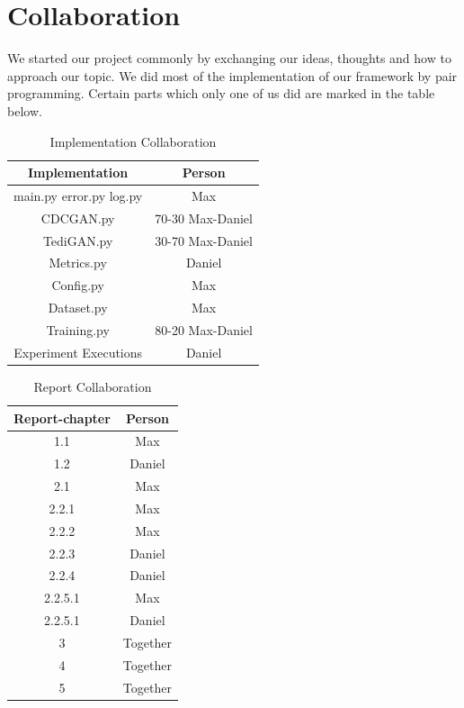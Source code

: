 \documentclass[12pt, a4paper]{article}
\begin{document}
\section{Collaboration}
We started our project commonly by exchanging our ideas, thoughts and how to approach our topic.
We did most of the implementation of our framework by pair programming. Certain parts which only one of us did are marked in the table below.
\begin{table}[h]
\centering
    \begin{tabular}{|c|c|}
        \hline
        Implementation & Person \\        
        \hline
        main.py error.py log.py & Max\\
        CDCGAN.py & 70-30 Max-Daniel\\
        TediGAN.py & 30-70 Max-Daniel\\
        Metrics.py & Daniel\\
        Config.py & Max\\
        Dataset.py & Max\\
        Training.py & 80-20 Max-Daniel\\
        Experiment Executions & Daniel\\
        \hline
    \end{tabular} 
    \caption{Implementation Collaboration}
\end{table}
\begin{table}[h]
\centering
    \begin{tabular}{|c|c|}
        \hline
        Report-chapter & Person \\        
        \hline
        1.1 & Max \\
        1.2 & Daniel \\
        2.1 & Max \\
        2.2.1 & Max \\
        2.2.2 & Max \\
        2.2.3 & Daniel \\
        2.2.4 & Daniel \\
        2.2.5.1 & Max \\
        2.2.5.1 & Daniel \\
        3 & Together \\
        4 & Together \\
        5 & Together \\
        \hline
    \end{tabular}
    \caption{Report Collaboration}
\end{table}

\pagebreak
\nocite{*}


\end{document}
